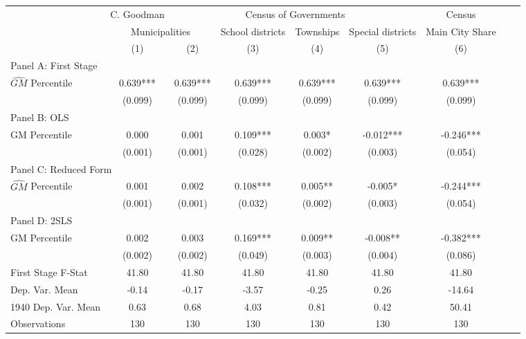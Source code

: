  \begin{tabular}{l*{8}{c}} \toprule
&\multicolumn{1}{c}{C. Goodman}&\multicolumn{4}{c}{Census of Governments}&\multicolumn{1}{c}{Census}\\\cmidrule(lr){2-2}\cmidrule(lr){3-6}\cmidrule(lr){7-7}
&\multicolumn{2}{c}{Municipalities}&\multicolumn{1}{c}{School districts}&\multicolumn{1}{c}{Townships}&\multicolumn{1}{c}{Special districts}&\multicolumn{1}{c}{Main City Share}\\\cmidrule(lr){2-3}\cmidrule(lr){4-6}\cmidrule(lr){7-7}
&\multicolumn{1}{c}{(1)}&\multicolumn{1}{c}{(2)}&\multicolumn{1}{c}{(3)}&\multicolumn{1}{c}{(4)}&\multicolumn{1}{c}{(5)}&\multicolumn{1}{c}{(6)}\\
\cmidrule(lr){1-7}
\multicolumn{6}{l}{Panel A: First Stage}\\
\cmidrule(lr){1-7}
$\widehat{GM}$ Percentile&    0.639***&    0.639***&    0.639***&    0.639***&    0.639***&    0.639***\\
                &  (0.099)   &  (0.099)   &  (0.099)   &  (0.099)   &  (0.099)   &  (0.099)   \\
\cmidrule(lr){1-7}
\multicolumn{6}{l}{Panel B: OLS}\\
\cmidrule(lr){1-7}
GM Percentile   &    0.000   &    0.001   &    0.109***&    0.003*  &   -0.012***&   -0.246***\\
                &  (0.001)   &  (0.001)   &  (0.028)   &  (0.002)   &  (0.003)   &  (0.054)   \\
\cmidrule(lr){1-7}
\multicolumn{6}{l}{Panel C: Reduced Form}\\
\cmidrule(lr){1-7}
$\widehat{GM}$ Percentile&    0.001   &    0.002   &    0.108***&    0.005** &   -0.005*  &   -0.244***\\
                &  (0.001)   &  (0.001)   &  (0.032)   &  (0.002)   &  (0.003)   &  (0.054)   \\
\cmidrule(lr){1-7}
\multicolumn{6}{l}{Panel D: 2SLS}\\
\cmidrule(lr){1-7}
GM Percentile   &    0.002   &    0.003   &    0.169***&    0.009** &   -0.008** &   -0.382***\\
                &  (0.002)   &  (0.002)   &  (0.049)   &  (0.003)   &  (0.004)   &  (0.086)   \\
\midrule
First Stage F-Stat&    41.80   &    41.80   &    41.80   &    41.80   &    41.80   &    41.80   \\
Dep. Var. Mean  &    -0.14   &    -0.17   &    -3.57   &    -0.25   &     0.26   &   -14.64   \\
1940 Dep. Var. Mean&     0.63   &     0.68   &     4.03   &     0.81   &     0.42   &    50.41   \\
Observations    &      130   &      130   &      130   &      130   &      130   &      130   \\
       \bottomrule \end{tabular}
